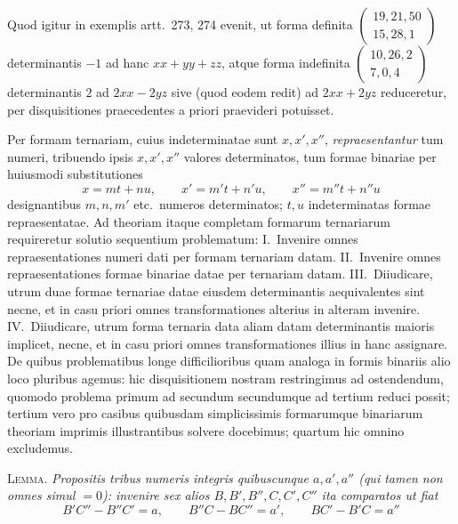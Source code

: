 Quod igitur in exemplis artt.\ 273, 274 evenit, ut forma definita
$\left(\begin{smallmatrix}19,21,50\\15,28,1\end{smallmatrix}\right)$
determinantis $-1$ ad hanc $xx+yy+zz$, atque forma indefinita
$\left(\begin{smallmatrix}10,26,2\\7,0,4\end{smallmatrix}\right)$
determinantis $2$ ad $2xx-2yz$ sive (quod eodem redit) ad $2xx+2yz$ reduceretur,
per disquisitiones praecedentes a priori praevideri potuisset.

Per formam ternariam, cuius indeterminatae sunt $x,x',x''$, \textit{repraesentantur}
tum numeri, tribuendo ipsis $x,x',x''$ valores determinatos, tum formae binariae
per huiusmodi substitutiones
\[
x=mt+nu,\qquad x'=m't+n'u,\qquad x''=m''t+n''u
\]
designantibus $m,n,m'$ etc.\ numeros determinatos; $t,u$ indeterminatas formae
repraesentatae. Ad theoriam itaque completam formarum ternariarum requireretur
solutio sequentium problematum: I.\ Invenire omnes repraesentationes numeri dati
per formam ternariam datam. II.\ Invenire omnes repraesentationes formae binariae
datae per ternariam datam. III.\ Diiudicare, utrum duae formae ternariae datae
eiusdem determinantis aequivalentes sint necne, et in casu priori omnes
transformationes alterius in alteram invenire. IV.\ Diiudicare, utrum forma
ternaria data aliam datam determinantis maioris implicet, necne, et in casu
priori omnes transformationes illius in hanc assignare. De quibus problematibus
longe difficilioribus quam analoga in formis binariis alio loco pluribus agemus:
hic disquisitionem nostram restringimus ad ostendendum, quomodo problema primum
ad secundum secundumque ad tertium reduci possit; tertium vero pro casibus
quibusdam simplicissimis formarumque binariarum theoriam imprimis illustrantibus
solvere docebimus; quartum hic omnino excludemus.

\textsc{Lemma.} \textit{Propositis tribus numeris integris quibuscunque $a,a',a''$
(qui tamen non omnes simul $=0$): invenire sex alios $B,B',B'',C,C',C''$ ita
comparatos ut fiat}
\[
B'C''-B''C'=a,\qquad B''C-BC''=a',\qquad BC'-B'C=a''
\]

